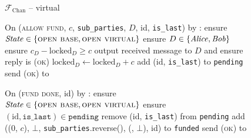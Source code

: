 \begin{figure}[H]
\begin{systembox}{$\mathcal{F}_{\mathrm{Chan}}$ -- virtual}
\begin{algorithmic}[1]
      \State On (\textsc{allow fund}, $c$, \texttt{sub\_parties}, $D$, id,
      \texttt{is\_last}) by \charlie:
      \label{code:functionality:chan:skeleton:virtual:allow_fund}
      \Indent
        \State ensure $\mathit{State} \in \{\textsc{open base}, \textsc{open
        virtual}\}$
        \State ensure $D \in \{\mathit{Alice}, \mathit{Bob}\}$
        \State ensure $c_D - \mathrm{locked}_D \geq c$
        \State output received message to $D$ and ensure reply is \textsc{(ok)}
        \State $\mathrm{locked}_D \gets \mathrm{locked}_D + c$
        \State add (id, \texttt{is\_last}) to \texttt{pending}
        \State send (\textsc{ok}) to \charlie
      \EndIndent
      \Statex

      \State On (\textsc{fund done}, id) by \charlie:
      \Indent
        \State ensure $\mathit{State} \in \{\textsc{open base}, \textsc{open
        virtual}\}$
        \State ensure $(\mathrm{id}, \mathtt{is\_last}) \in \mathtt{pending}$
        \State remove (id, \texttt{is\_last}) from \texttt{pending}
          \State add ((0, $c$), $\bot$, \texttt{sub\_parties}.reverse(),
          (\dave, $\bot$), id) to \texttt{funded}
        \EndIf
        \State send (\textsc{ok}) to \charlie
      \EndIndent
    \end{algorithmic}
  \end{systembox}
  \caption{}
  \label{code:functionality:chan:skeleton:virtual}
\end{figure}
